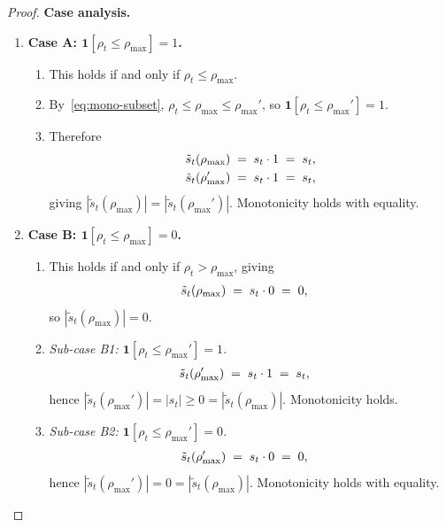 \documentclass[12pt,openany]{book}
\numberwithin{equation}{chapter}
\theoremstyle{plain}
\theoremstyle{definition}
\theoremstyle{remark}
\numberwithin{equation}{chapter}
\theoremstyle{plain}
\begin{document}
\begin{proof}
\medskip
\noindent\textbf{Case analysis.}
\begin{enumerate}
  \item \textbf{Case A: $\mathbf{1}[\rho_t \leq \rho_{\max}] = 1$.}
        \begin{enumerate}
          \item This holds if and only if $\rho_t \leq \rho_{\max}$.
          \item By~\eqref{eq:mono-subset}, $\rho_t \leq \rho_{\max}
                \leq \rho_{\max}'$, so
                $\mathbf{1}[\rho_t \leq \rho_{\max}'] = 1$.
          \item Therefore
                \begin{align}
                  \tilde{s}_t(\rho_{\max})
                  &\;=\; s_t \cdot 1 \;=\; s_t,
                  \notag\\
                  \tilde{s}_t(\rho_{\max}')
                  &\;=\; s_t \cdot 1 \;=\; s_t,
                  \notag
                \end{align}
                giving $|\tilde{s}_t(\rho_{\max})| =
                |\tilde{s}_t(\rho_{\max}')|$.
                Monotonicity holds with equality.
        \end{enumerate}

  \item \textbf{Case B: $\mathbf{1}[\rho_t \leq \rho_{\max}] = 0$.}
        \begin{enumerate}
          \item This holds if and only if $\rho_t > \rho_{\max}$,
                giving
                \begin{align}
                  \tilde{s}_t(\rho_{\max})
                  &\;=\; s_t \cdot 0 \;=\; 0,
                  \notag
                \end{align}
                so $|\tilde{s}_t(\rho_{\max})| = 0$.
          \item \emph{Sub-case B1:
                $\mathbf{1}[\rho_t \leq \rho_{\max}'] = 1$.}
                \begin{align}
                  \tilde{s}_t(\rho_{\max}')
                  &\;=\; s_t \cdot 1 \;=\; s_t,
                  \notag
                \end{align}
                hence $|\tilde{s}_t(\rho_{\max}')| = |s_t| \geq 0
                = |\tilde{s}_t(\rho_{\max})|$.
                Monotonicity holds.
          \item \emph{Sub-case B2:
                $\mathbf{1}[\rho_t \leq \rho_{\max}'] = 0$.}
                \begin{align}
                  \tilde{s}_t(\rho_{\max}')
                  &\;=\; s_t \cdot 0 \;=\; 0,
                  \notag
                \end{align}
                hence $|\tilde{s}_t(\rho_{\max}')| = 0
                = |\tilde{s}_t(\rho_{\max})|$.
                Monotonicity holds with equality.
        \end{enumerate}
\end{enumerate}


\end{proof}
\end{document}
